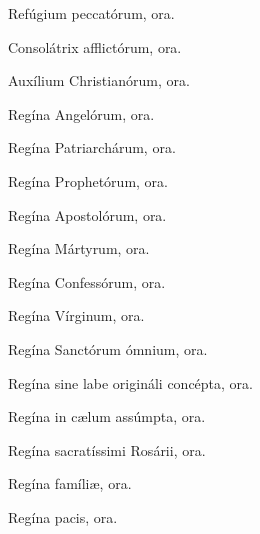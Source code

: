 \noindent Refúgium peccatórum, \hfill 
 ora.
 
\noindent Consolátrix afflictórum, \hfill  
 ora.
 
\noindent Auxílium Christianórum,  \hfill
 ora.
 
\noindent Regína Angelórum, \hfill 
 ora.
 
\noindent Regína Patriarchárum, \hfill  
 ora.
 
\noindent Regína Prophetórum, \hfill  
 ora.
 
\noindent Regína Apostolórum, \hfill 
 ora.
 
\noindent Regína Mártyrum, \hfill
 ora.
 
\noindent Regína Confessórum, \hfill
 ora.
 
\noindent Regína Vírginum, \hfill 
 ora.
 
\noindent Regína San\-ctórum ómnium, \hfill   
 ora.
 
\noindent Regína sine labe origináli concé\-pta, \hfill  
 \hfill ora.
 
\noindent Regína in cælum assúm\-pta, \hfill  
 ora.
 
\noindent Regína sacratíssimi Rosárii, \hfill
 ora.
 
\noindent Regína famíliæ, \hfill   
 ora.
 
\noindent Regína pacis, \hfill  
 ora.